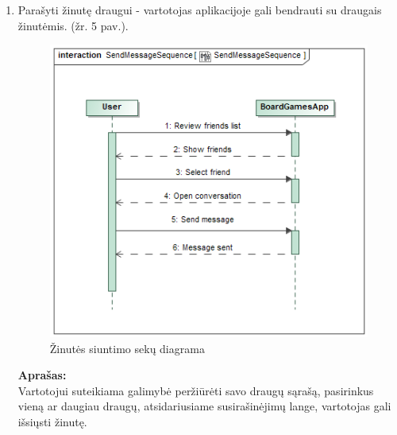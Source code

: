 \documentclass{VUMIFPSkursinis}
\begin{document}
\begin{enumerate}
			\item Parašyti žinutę draugui - vartotojas aplikacijoje gali bendrauti 
			su draugais žinutėmis. (žr. 5 pav.).
				\begin{figure}[H]
					\centering
					\includegraphics[scale=0.5]{img/SendMessageSequence}
					\caption{Žinutės siuntimo sekų diagrama}
					\label{img:SendMessageSequence}
				\end{figure}
				\textbf{Aprašas:}\\
					Vartotojui suteikiama galimybė peržiūrėti savo draugų sąrašą, 
					pasirinkus vieną ar daugiau draugų, atsidariusiame 
					susirašinėjimų lange, vartotojas gali išsiųsti žinutę.
					

\end{enumerate}
\end{document}
